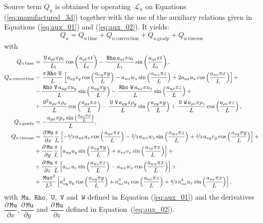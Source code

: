 \documentclass[10pt]{article}
\newcommand{\diff}[2] {\dfrac{\partial #1}{\partial #2}}
\newcommand{\Rho}{\,\mathtt{Rho}}
\newcommand{\U}{\,\mathtt{U}}
\newcommand{\V}{\,\mathtt{V}}
\newcommand{\W}{\,\mathtt{W}}
\newcommand{\Lo}{\,\mathcal{L}}
\newcommand{\Mu}{\,\mathtt{Mu}}
\newcommand{\DMuDx}{\diff{\Mu}{x}}
\newcommand{\DMuDy}{\diff{\Mu}{y}}
\newcommand{\DMuDz}{\diff{\Mu}{z}}
\newcommand{\convection}{\text{convection}}
\newcommand{\gradp}{\text{grad}p}
\newcommand{\viscous}{\text{viscous}}
\begin{document}
Source term $Q_u$ is obtained by operating $\Lo_{u}$ on Equations  (\ref{eq:manufactured_3d}) together with the use of the  auxiliary relations given in Equations (\ref{eq:aux_01}) and (\ref{eq:aux_02}). It yields:
\begin{equation*}
 \label{eq:ns1d_12}
Q_u = Q_{u \, \text{time}}+Q_{u \, \convection}+Q_{u \, \gradp }+Q_{u \, \viscous }
\end{equation*}
with
\begin{equation*}
 \begin{split}
 Q_{u \, \text{time}}&= 
\frac{ \U \, a_{\rho t} \pi\rho_{t} }{L_t}\cos\left(\frac{a_{\rho t} \pi t}{L_t}\right) - \frac{\Rho \, a_{ut} \pi u_{t} }{L_t}\sin\left(\frac{a_{ut} \pi t}{L_t}\right),\\
%
 Q_{u \, \text{convection}}&= 
\frac{\pi \Rho \, \U \, }{L} \left[a_{vy} v_{y}\cos\left(\frac{a_{vy} \pi y}{L}\right) - a_{wz} w_{z} \sin\left(\frac{a_{wz} \pi z}{L}\right) + 2 a_{ux} u_{x} \cos\left(\frac{a_{ux} \pi x}{L}\right)\right] + \\ 
&- \frac{ \Rho \, \V \, a_{uy} \pi u_{y} }{L}\sin\left(\frac{a_{uy} \pi y}{L}\right) - \frac{\Rho \, \W \, a_{uz} \pi u_{z} }{L} \sin\left(\frac{a_{uz} \pi z}{L}\right)+\\
&+ \frac{\U^{2} a_{\rho x} \pi \rho_{x} }{L}\cos\left(\frac{a_{\rho x} \pi x}{L}\right) - \frac{ \U \, \V \, a_{\rho y} \pi\rho_{y} }{L}\sin\left(\frac{a_{\rho y} \pi y}{L}\right)+ \frac{ \U \, \W \, a_{\rho z} \pi\rho_{z} }{L}\cos\left(\frac{a_{\rho z} \pi z}{L}\right) ,\\
%
Q_{u \, \text{gradp}}&= - \frac{a_{px} \pi p_{x} \sin\left(\frac{a_{px} \pi x}{L}\right)}{L}, \\
%
Q_{u \, \text{viscous}}&= 
\DMuDx\frac{\pi }{L} \left[- \nicefrac{4}{3} \, a_{ux} u_{x} \cos\left(\frac{a_{ux} \pi x}{L}\right) - \nicefrac{2}{3} \, a_{wz} w_{z} \sin\left(\frac{a_{wz} \pi z}{L}\right) + \nicefrac{2}{3} \, a_{vy} v_{y} \cos\left(\frac{a_{vy} \pi y}{L}\right)\right] + \\ 
&+ \DMuDy\frac{\pi }{L} \left[a_{uy} u_{y} \sin\left(\frac{a_{uy} \pi y}{L}\right) + a_{vx} v_{x} \sin\left(\frac{a_{vx} \pi x}{L}\right)\right] + \\ 
&+ \DMuDz\frac{\pi }{L} \left[a_{uz} u_{z} \sin\left(\frac{a_{uz} \pi z}{L}\right) - a_{wx} w_{x} \cos\left(\frac{a_{wx} \pi x}{L}\right)\right] + \\ 
&+ \frac{\Mu \pi^{2} }{L^2} \left[a_{uy}^{2} u_{y} \cos\left(\frac{a_{uy} \pi y}{L}\right) + a_{uz}^{2} u_{z} \cos\left(\frac{a_{uz} \pi z}{L}\right) + \nicefrac{4}{3} \, a_{ux}^{2} u_{x} \sin\left(\frac{a_{ux} \pi x}{L}\right)\right],
 \end{split}
\end{equation*}
with $\Mu,\, \Rho,\,\U,\,\V$ and $\W$  defined in Equation (\ref{eq:aux_01}) and the derivatives $\DMuDx,\DMuDy$ and $\DMuDz$ defined in Equation~(\ref{eq:aux_02}).
\end{document}
